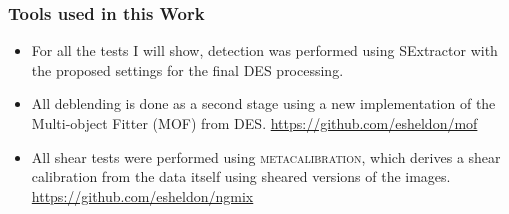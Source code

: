 \documentclass{beamer}
\newcommand{\mcal}{\textsc{metacalibration}}
\begin{document}
\frame
{
    \frametitle{Tools used in this Work}

 
    \begin{itemize}

        \item For all the tests I will show, detection was performed using SExtractor
            with the proposed settings for the final DES processing.

        \item All deblending is done as a second stage using a new implementation
            of the Multi-object Fitter (MOF) from DES. \url{https://github.com/esheldon/mof}

        \item All shear tests were performed using \mcal, which derives a shear
            calibration from the data itself using sheared versions of the images.
            \url{https://github.com/esheldon/ngmix}


    \end{itemize}

}
\end{document}
